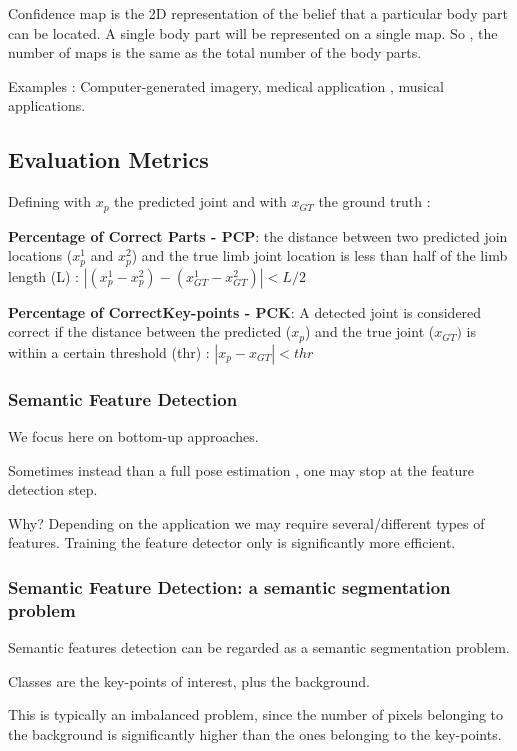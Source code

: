 \documentclass{article}
\begin{document}
Confidence map is the 2D representation of the belief that a particular body part can be located. A single body part will be represented on a single map. So , the number of maps is the same as the total number of the body parts.

Examples : Computer-generated imagery, medical application , musical applications.

\subsection{Evaluation Metrics}

Defining with $x_p$ the predicted joint and with $x_{GT}$ the ground truth :

\textbf{Percentage of Correct Parts - PCP}: the distance between two predicted join locations ($x_p^1$ and $x_p^2$) and the true limb joint location is less than half of the limb length (L) :  $|(x_p^1 - x_p^2) - (x_{GT}^1 - x_{GT}^2)| < L/2$

\vspace{5mm}

\textbf{Percentage of CorrectKey-points - PCK}: A detected joint is considered correct if the distance between the predicted ($x_p$) and the true joint ($x_{GT})$ is within a certain threshold (thr) :  $|x_p - x_{GT}| < thr $

\subsubsection{Semantic Feature Detection}

We focus here on bottom-up approaches.

Sometimes instead than a full pose estimation , one may stop at the feature detection step.

Why? Depending on the application we may require several/different types of features. Training the feature detector only is significantly more efficient.

\subsubsection{Semantic Feature Detection: a semantic segmentation problem}

Semantic features detection can be regarded as a semantic segmentation problem.

Classes are the key-points of interest, plus the background.

This is typically an imbalanced problem, since the number of pixels belonging to the background is significantly higher than the ones belonging to the key-points.
\end{document}
